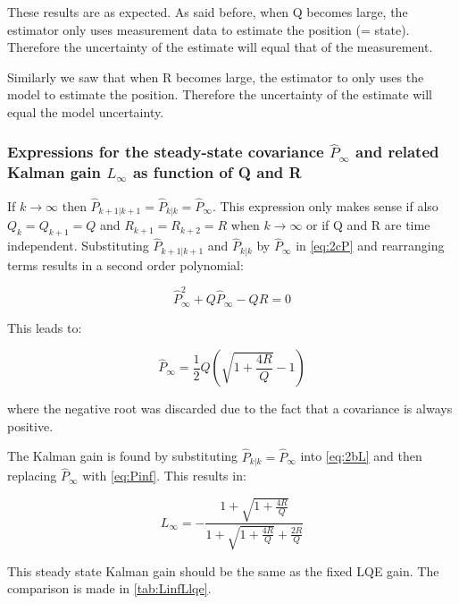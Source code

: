 \documentclass[a4paper]{article}
\newcommand{\newpar}{\vspace{.3cm}\noindent}
\begin{document}
\newpar
These results are as expected. As said before, when Q becomes large, the estimator only uses measurement data to estimate the position (= state). Therefore the uncertainty of the estimate will equal that of the measurement.

\newpar
Similarly we saw that when R becomes large, the estimator to only uses the model to estimate the position. Therefore the uncertainty of the estimate will equal the model uncertainty.

\subsubsection{Expressions for the steady-state covariance \(\hat{P}_{\infty}\) and related Kalman gain \(L_{\infty}\) as function of Q and R}

If \(k\to\infty\) then \(\hat{P}_{k+1|k+1} = \hat{P}_{k|k} = \hat{P}_{\infty}\). This expression only makes sense if also  \(Q_{k} = Q_{k+1} = Q\) and \(R_{k+1} = R_{k+2} = R\) when \(k\to\infty\) or if Q and R are time independent. Substituting \(\hat{P}_{k+1|k+1}\) and \(\hat{P}_{k|k}\) by \(\hat{P}_{\infty}\) in \autoref{eq:2cP} and rearranging terms results in a second order polynomial:

\begin{equation}
    \hat{P}_{\infty}^2 + Q\hat{P}_{\infty} - QR = 0
\end{equation}

\newpar
This leads to:

\begin{equation}
    \hat{P}_{\infty} = \frac{1}{2} Q \left( \sqrt{1+\frac{4R}{Q}} - 1\right)
    \label{eq:Pinf}
\end{equation}

\newpar
where the negative root was discarded due to the fact that a covariance is always positive.

\newpar
The Kalman gain is found by substituting \(\hat{P}_{k|k} = \hat{P}_{\infty}\) into \autoref{eq:2bL} and then replacing \(\hat{P}_{\infty}\) with \autoref{eq:Pinf}. This results in:

\begin{equation}
    L_{\infty} = -\frac{1+\sqrt{1+\frac{4R}{Q}}}{1+\sqrt{1+\frac{4R}{Q}}+\frac{2R}{Q}}
    \label{eq:Linf}
\end{equation}

\newpar
This steady state Kalman gain should be the same as the fixed LQE gain. The comparison is made in \autoref{tab:LinfLlqe}.
\end{document}
